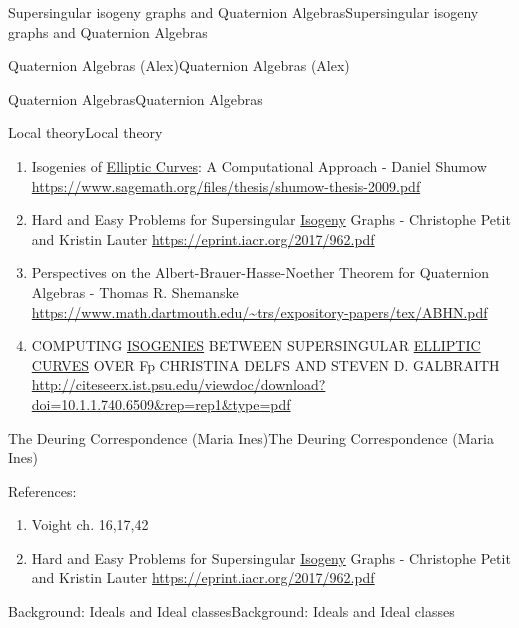 \documentclass[10pt,]{book}
\numberwithin{equation}{section}
\begin{document}
\begin{chapterptx}{Supersingular isogeny graphs and Quaternion Algebras}{}{Supersingular isogeny graphs and Quaternion Algebras}{}{}
\begin{sectionptx}{Quaternion Algebras (Alex)}{}{Quaternion Algebras (Alex)}{}{}
\begin{subsectionptx}{Quaternion Algebras}{}{Quaternion Algebras}{}{}
\begin{subsubsectionptx}{Local theory}{}{Local theory}{}{}
\begin{enumerate}
\item\hypertarget{li-230}{}Isogenies of \hyperref[def-supersing-isog-ec]{Elliptic Curves}: A Computational Approach - Daniel Shumow \url{https://www.sagemath.org/files/thesis/shumow-thesis-2009.pdf}%
\item\hypertarget{li-231}{}Hard and Easy Problems for Supersingular \hyperref[def-supersing-isog-isog]{Isogeny} Graphs - Christophe Petit and Kristin Lauter \url{https://eprint.iacr.org/2017/962.pdf}%
\item\hypertarget{li-232}{}Perspectives on the Albert-Brauer-Hasse-Noether Theorem for Quaternion Algebras -  Thomas R. Shemanske \url{https://www.math.dartmouth.edu/\~trs/expository-papers/tex/ABHN.pdf}%
\item\hypertarget{li-233}{}COMPUTING \hyperref[def-supersing-isog-isog]{ISOGENIES} BETWEEN SUPERSINGULAR \hyperref[def-supersing-isog-ec]{ELLIPTIC CURVES} OVER Fp CHRISTINA DELFS AND STEVEN D. GALBRAITH \url{http://citeseerx.ist.psu.edu/viewdoc/download?doi=10.1.1.740.6509\&rep=rep1\&type=pdf}%
\end{enumerate}
%
\end{subsubsectionptx}
\end{subsectionptx}
\end{sectionptx}
%
%
\typeout{************************************************}
\typeout{************************************************}
%
\begin{sectionptx}{The Deuring Correspondence (Maria Ines)}{}{The Deuring Correspondence (Maria Ines)}{}{}\label{sec-deuring}
\begin{introduction}{}%
\hypertarget{p-936}{}%
References:%
\par
\hypertarget{p-937}{}%
\leavevmode%
\begin{enumerate}
\item\hypertarget{li-234}{}Voight ch. 16,17,42%
\item\hypertarget{li-235}{}Hard and Easy Problems for Supersingular \hyperref[def-supersing-isog-isog]{Isogeny} Graphs - Christophe Petit and Kristin Lauter \url{https://eprint.iacr.org/2017/962.pdf}%
\end{enumerate}
%
\end{introduction}%
%
%
\typeout{************************************************}
\typeout{************************************************}
%
\begin{subsectionptx}{Background: Ideals and Ideal classes}{}{Background: Ideals and Ideal classes}{}{}\label{subsection-75}

\end{subsectionptx}
\end{sectionptx}
\end{chapterptx}
\end{document}
